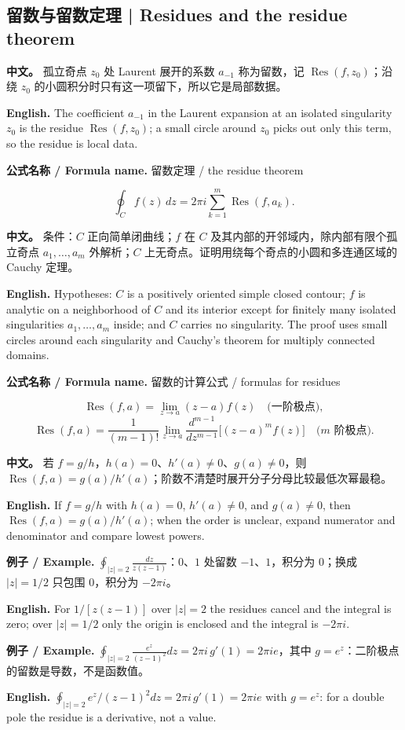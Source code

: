 \documentclass[UTF8,11pt,a4paper]{ctexart}
\newcommand{\EN}[1]{\par\noindent \textbf{English.} #1\par}
\newcommand{\FORMULA}[2]{\par\noindent\textbf{公式名称 / Formula name.} #1 / #2\par}
\newcommand{\EX}[2]{\par\noindent \textbf{例子 / Example.} #1\par\EN{#2}}
\newcommand{\APS}[2]{\par\noindent\textbf{中文。} #1\par\noindent\textbf{English.} #2\par\smallskip}
\begin{document}
\subsection{留数与留数定理 | Residues and the residue theorem}
\APS{孤立奇点 $z_0$ 处 Laurent 展开的系数 $a_{-1}$ 称为留数，记 $\operatorname{Res}(f,z_0)$；沿绕 $z_0$ 的小圆积分时只有这一项留下，所以它是局部数据。}{The coefficient $a_{-1}$ in the Laurent expansion at an isolated singularity $z_0$ is the residue $\operatorname{Res}(f,z_0)$; a small circle around $z_0$ picks out only this term, so the residue is local data.}
\FORMULA{留数定理}{the residue theorem}
\[
\oint_C f(z)\,dz=2\pi i\sum_{k=1}^{m}\operatorname{Res}(f,a_k).
\]
\APS{条件：$C$ 正向简单闭曲线；$f$ 在 $C$ 及其内部的开邻域内，除内部有限个孤立奇点 $a_1,\dots,a_m$ 外解析；$C$ 上无奇点。证明用绕每个奇点的小圆和多连通区域的 Cauchy 定理。}{Hypotheses: $C$ is a positively oriented simple closed contour; $f$ is analytic on a neighborhood of $C$ and its interior except for finitely many isolated singularities $a_1,\dots,a_m$ inside; and $C$ carries no singularity. The proof uses small circles around each singularity and Cauchy's theorem for multiply connected domains.}
\FORMULA{留数的计算公式}{formulas for residues}
\[
\operatorname{Res}(f,a)=\lim_{z\to a}(z-a)f(z)\quad\text{(一阶极点)},
\]
\[
\operatorname{Res}(f,a)=\frac1{(m-1)!}\lim_{z\to a}\frac{d^{m-1}}{dz^{m-1}}\big[(z-a)^mf(z)\big]\quad\text{($m$ 阶极点)}.
\]
\APS{若 $f=g/h$，$h(a)=0$、$h'(a)\ne0$、$g(a)\ne0$，则 $\operatorname{Res}(f,a)=g(a)/h'(a)$；阶数不清楚时展开分子分母比较最低次幂最稳。}{If $f=g/h$ with $h(a)=0$, $h'(a)\ne0$, and $g(a)\ne0$, then $\operatorname{Res}(f,a)=g(a)/h'(a)$; when the order is unclear, expand numerator and denominator and compare lowest powers.}
\EX{$\oint_{|z|=2}\frac{dz}{z(z-1)}$：$0$、$1$ 处留数 $-1$、$1$，积分为 $0$；换成 $|z|=1/2$ 只包围 $0$，积分为 $-2\pi i$。}{For $1/[z(z-1)]$ over $|z|=2$ the residues cancel and the integral is zero; over $|z|=1/2$ only the origin is enclosed and the integral is $-2\pi i$.}
\EX{$\oint_{|z|=2}\frac{e^z}{(z-1)^2}dz=2\pi i\,g'(1)=2\pi ie$，其中 $g=e^z$：二阶极点的留数是导数，不是函数值。}{$\oint_{|z|=2}e^z/(z-1)^2dz=2\pi i\,g'(1)=2\pi ie$ with $g=e^z$: for a double pole the residue is a derivative, not a value.}
\end{document}
